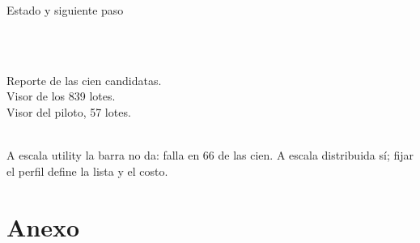 \documentclass[aspectratio=169, 11pt]{beamer}
\begin{document}
\begin{frame}{Estado y siguiente paso}
  \vspace{-0.35em}
  \hspace{0.01\textwidth}\begin{minipage}{0.96\textwidth}
    \filete\\[0.25em]
    \begin{minipage}[t]{0.47\linewidth}
      \raggedright
      \\[0.5em]{\footnotesize\textcolor{tinta2}{Reporte de las cien candidatas.\\[0.15em]
      Visor de los 839 lotes.\\[0.15em]
      Visor del piloto, 57 lotes.}}
    \end{minipage}\hfill
    \begin{minipage}[t]{0.47\linewidth}
      \raggedright
      \\[0.5em]{\footnotesize\textcolor{tinta2}{A escala utility la barra no da: falla en 66
      de las cien. A escala distribuida sí; fijar el perfil define la lista y el costo.}}
    \end{minipage}
  \end{minipage}
\end{frame}

\section{Anexo}
\end{document}
